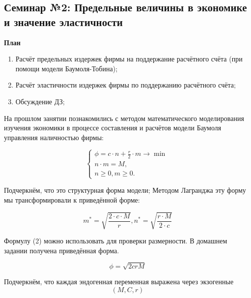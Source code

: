 \documentclass[12pt,a4paper]{article}
\author{GH-TIMe}
\begin{document}
\begin{center}
\section*{Семинар №2: Предельные величины в экономике и значение эластичности}
\end{center}

\begin{center}
\textbf{План}
\end{center}
\begin{enumerate}
\item Расчёт предельных издержек фирмы на поддержание расчётного счёта (при помощи модели Баумоля-Тобина);
\item Расчёт эластичности издержек фирмы по поддержанию расчётного счёта;
\item Обсуждение ДЗ;
\end{enumerate}

На прошлом занятии познакомились с методом математического моделирования изучения экономики в процессе составления и расчётов модели Баумоля управления наличностью фирмы:

\begin{equation}
	\begin{cases}
	\phi = c \cdot n + \displaystyle{\frac{r}{2}} \cdot m \rightarrow \min \\
	n \cdot m = M, \\
	n \geq 0, m \geq 0.
	\end{cases}
\end{equation}

Подчеркнём, что это структурная форма модели; Методом Лагранджа эту форму мы трансформировали к приведённой форме:

\begin{equation}
m^*=\sqrt{\displaystyle{\frac{2 \cdot c \cdot M}{r}}}, n^*=\sqrt{\displaystyle{\frac{r \cdot M}{2 \cdot c}}}
\end{equation}

Формулу (2) можно использовать для проверки размерности. В домашнем задании получена приведённая форма. 

\begin{equation}
\phi = \sqrt{2crM}
\end{equation}

Подчеркнём, что каждая эндогенная переменная выражена через экзогенные 
\begin{equation}
(M, C, r)
\end{equation}
\end{document}
